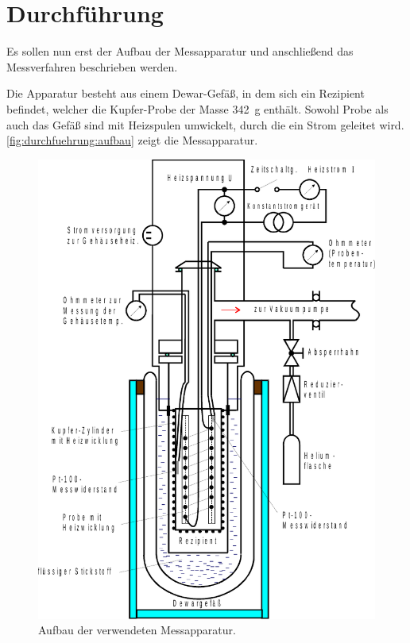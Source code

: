 \section{Durchführung}
\label{sec:durchfuehrung}

    Es sollen nun erst der Aufbau der Messapparatur und anschließend das Messverfahren beschrieben werden.

    Die Apparatur besteht aus einem Dewar-Gefäß,
    in dem sich ein Rezipient befindet,
    welcher die Kupfer-Probe der Masse \SI{342}{\gram} enthält.
    Sowohl Probe als auch das Gefäß sind mit Heizspulen umwickelt,
    durch die ein Strom geleitet wird.
    \autoref{fig:durchfuehrung:aufbau} zeigt die Messapparatur.
    \begin{figure}
        \centering
        \includegraphics[width=\textwidth]{content/img/Abb_1.pdf}
        \caption{Aufbau der verwendeten Messapparatur. \cite{versuchsanleitung}}
        \label{fig:durchfuehrung:aufbau}
    \end{figure}


